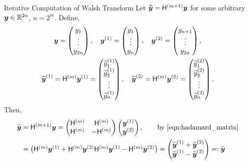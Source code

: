 \documentclass[handout, 10pt,compress,xcolor={usenames,dvipsnames}]{beamer} %
\begin{document}
\begin{frame}{Iterative Computation of Walsh Transform}
\vspace{-4ex}
Let $\widetilde{\boldsymbol{y}} = \mathsf{H}^{(m+1)} {\boldsymbol{y}}$ for some arbitrary $\boldsymbol{y} \in \mathbb{R}^{2n}$, $n = 2^m$. Define, 
\begin{gather*}
\boldsymbol{y} = \begin{pmatrix} y_1 \\ \vdots \\ y_{2n} \end{pmatrix}, \quad 
\boldsymbol{y}^{(1)} = \begin{pmatrix} y_1 \\ \vdots \\ y_{n} \end{pmatrix}, \quad 
\boldsymbol{y}^{(2)}  = \begin{pmatrix} y_{n+1} \\ \vdots \\ y_{2n} \end{pmatrix}, \\ 
\widetilde{\boldsymbol{y}}^{(1)} = \mathsf{H}^{(m)} \boldsymbol{y}^{(1)} = 
\begin{pmatrix} \widetilde{y}^{(1)}_1 \\ \widetilde{y}^{(1)}_2 \\ \vdots \\ \widetilde{y}^{(1)}_{n} \end{pmatrix}, \quad 
\widetilde{\boldsymbol{y}}^{(2)}  =  \mathsf{H}^{(m)} \boldsymbol{y}^{(2)} =
\begin{pmatrix} \widetilde{y}^{(2)}_{1} \\  \widetilde{y}^{(2)}_{2} \\ \vdots \\ \widetilde{y}^{(2)}_{n} \end{pmatrix}. 
\end{gather*}
Then,
\begin{align*}
\widetilde{\boldsymbol{y}} &= \mathsf{H}^{({m+1})} {\boldsymbol{y}} 
 = \begin{pmatrix}
\mathsf{H}^{(m)} & \mathsf{H}^{(m)} \\ \mathsf{H}^{(m)} & - \mathsf{H}^{(m)}
\end{pmatrix} 
\begin{pmatrix}
\boldsymbol{y}^{(1)} \\ \boldsymbol{y}^{(2)}
\end{pmatrix}, \qquad \text{by \eqref{eqn:hadamard_matrix}} \\
&= 
\begin{pmatrix}
\mathsf{H}^{(m)} \boldsymbol{y}^{(1)} + \mathsf{H}^{(m)} \boldsymbol{y}^{(2)} 
\mathsf{H}^{(m)} \boldsymbol{y}^{(1)} - \mathsf{H}^{(m)} \boldsymbol{y}^{(2)}
\end{pmatrix}
= 
\begin{pmatrix}
\widetilde{\boldsymbol{y}}^{(1)} + \widetilde {\boldsymbol{y}}^{(2)} \\ 
\widetilde {\boldsymbol{y}}^{(1)} - \widetilde {\boldsymbol{y}}^{(2)}
\end{pmatrix} =: \widetilde{\boldsymbol{y}} 
\end{align*}
\end{frame}
\end{document}
